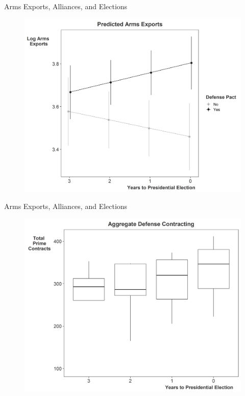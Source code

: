 \documentclass[12pt]{beamer}
\begin{document}

\begin{frame}{Arms Exports, Alliances, and Elections}

\begin{figure}[htbp]
	\centering
		\includegraphics[height=.90\textheight]{us-arms-pred.png}
\end{figure}


\end{frame}



\begin{frame}{Arms Exports, Alliances, and Elections}

\begin{figure}[htbp]
	\centering
		\includegraphics[height=.90\textheight]{contract-cycles.png}
\end{figure}


\end{frame}
\end{document}

